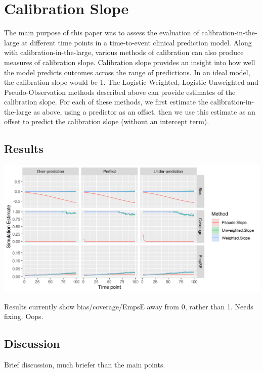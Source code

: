 \documentclass[12pt,PhD,twoside,openright]{muthesis}
\begin{document}
\hypertarget{calibration-slope}{%
\section{Calibration Slope}\label{calibration-slope}}

The main purpose of this paper was to assess the evaluation of calibration-in-the-large at different time points in a time-to-event clinical prediction model. Along with calibration-in-the-large, various methods of calibration can also produce measures of calibration slope. Calibration slope provides an insight into how well the model predicts outcomes across the range of predictions. In an ideal model, the calibration slope would be 1. The Logistic Weighted, Logistic Unweighted and Pseudo-Observation methods described above can provide estimates of the calibration slope. For each of these methods, we first estimate the calibration-in-the-large as above, using a predictor as an offset, then we use this estimate as an offset to predict the calibration slope (without an intercept term).

\hypertarget{results-6}{%
\subsection{Results}\label{results-6}}

\includegraphics[width=54.68in]{figure/IPCW_Logistic/SlopePlot_b(1)_g(0)_e(0.5)}

Results currently show bias/coverage/EmpsE away from 0, rather than 1. Needs fixing. Oops.

\hypertarget{discussion-5}{%
\subsection{Discussion}\label{discussion-5}}

Brief discussion, much briefer than the main points.
\end{document}
